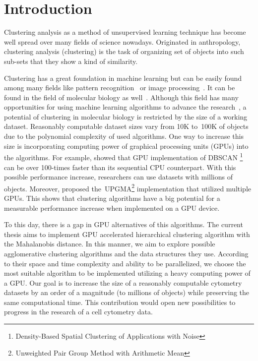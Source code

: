 \chapter*{Introduction}


Clustering analysis as a method of unsupervised learning technique has become well spread over many fields of science nowadays. Originated in anthropology, clustering analysis (clustering) is the task of organizing set of objects into such sub-sets that they show a kind of similarity. 

Clustering has a great foundation in machine learning but can be easily found among many fields like pattern recognition~\cite{pare} or image processing~\cite{sathya2011image}. It can be found in the field of molecular biology as well~\cite{Nugent2010}. Although this field has many opportunities for using machine learning algorithms to advance the research~\cite{btaa091}, a potential of clustering in molecular biology is restricted by the size of a working dataset. Reasonably computable dataset sizes vary from 10K to~100K of objects due to the polynomial complexity of used algorithms. One way to increase this size is incorporating computing power of graphical processing units (GPUs) into the algorithms. For example, \citet{andrade2013g} showed that GPU implementation of DBSCAN \footnote{Density-Based Spatial Clustering of Applications with Noise} can be over 100-times faster than its sequential CPU counterpart. With this possible performance increase, researchers can use datasets with millions of objects. Moreover, \citet{hua2017mgupgma} proposed the~UPGMA\footnote{Unweighted Pair Group Method with Arithmetic Mean} implementation that utilized multiple GPUs. This shows that clustering algorithms have a big potential for a measurable performance increase when implemented on a GPU device.

To this day, there is a gap in GPU alternatives of this algorithms. The current thesis aims to implement GPU accelerated hierarchical clustering algorithm with the Mahalanobis distance. In this manner, we aim to explore possible agglomerative clustering algorithms and the data structures they use. According to their space and time complexity and ability to be parallelized, we choose the most suitable algorithm to be implemented utilizing a heavy computing power of a GPU. Our goal is to increase the size of a reasonably computable cytometry datasets by an order of a magnitude (to millions of objects) while preserving the same computational time. This contribution would open new possibilities to progress in the research of a cell cytometry data.

